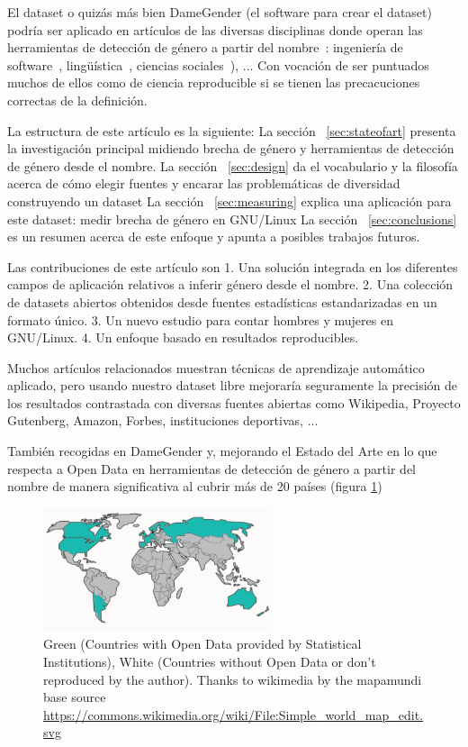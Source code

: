 \documentclass[a4paper]{article}
\begin{document}
El dataset o quizás más bien DameGender (el software para crear el dataset)
podría ser aplicado en artículos de las diversas disciplinas donde operan
las herramientas de detección de género a partir del nombre~\cite{sun2019mitigating}:
ingeniería de software~\cite{vasilescu2012gender}, lingüística~\cite{hutson2016gender,al2009socio},
ciencias sociales~\cite{holman2018gender,mislove2011understanding,niemi2017gendered,de2014genero}),
... Con vocación de ser puntuados muchos de ellos como de ciencia
reproducible\cite{peng2011reproducible} si se tienen las precacuciones
correctas de la definición.

La estructura de este artículo es la siguiente:
La sección ~\ref{sec:stateofart} presenta la investigación principal midiendo brecha de género
y herramientas de detección de género desde el nombre.
La sección ~\ref{sec:design} da el vocabulario y la filosofía acerca de cómo elegir
fuentes y encarar las problemáticas de diversidad construyendo un
dataset
La sección ~\ref{sec:measuring} explica una aplicación para este dataset: medir brecha de
género en GNU/Linux
La sección ~\ref{sec:conclusions} es un resumen acerca de este enfoque y apunta a posibles
trabajos futuros.

Las contribuciones de este artículo son
1. Una solución integrada en los diferentes campos de aplicación relativos
a inferir género desde el nombre.
2. Una colección de datasets abiertos obtenidos desde fuentes estadísticas
estandarizadas en un formato único.
3. Un nuevo estudio para contar hombres y mujeres en GNU/Linux.
4. Un enfoque basado en resultados reproducibles.

Muchos artículos relacionados muestran técnicas de aprendizaje automático
aplicado, pero usando nuestro dataset libre mejoraría seguramente la
precisión de los resultados contrastada con diversas fuentes abiertas como Wikipedia,
Proyecto Gutenberg, Amazon, Forbes, instituciones deportivas, ... 

También recogidas en DameGender y, mejorando el Estado del Arte en lo que
respecta a Open Data en herramientas de detección de género a partir del
nombre de manera significativa al cubrir más de 20 países (figura \ref{fig:mapamundi})

\begin{figure}
  \centering
  \includegraphics[width=0.6\textwidth]{images/Simple_world_map_edit.pdf}
  \caption[Caption for LOF]{Green (Countries with Open Data provided by Statistical Institutions), White (Countries without Open Data or don't reproduced by the author). Thanks to wikimedia by the mapamundi base source \url{https://commons.wikimedia.org/wiki/File:Simple_world_map_edit.svg}}
  \label{fig:mapamundi}
\end{figure}
\end{document}

